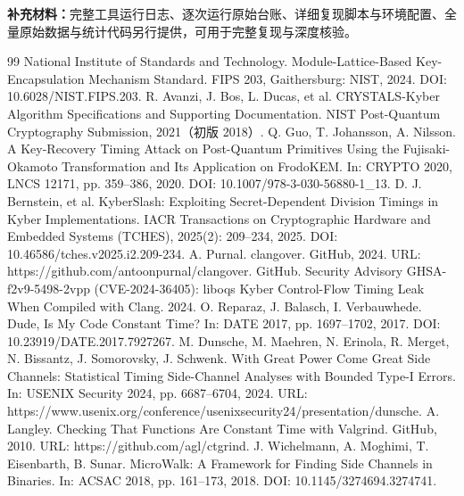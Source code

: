 \documentclass{a113_report}
\begin{document}
\makecover
\makeinfotable

\tableofcontents
\clearpage


\clearpage

\clearpage

\clearpage

\clearpage

\clearpage


\vspace{1.5em}
\noindent\textbf{补充材料：}完整工具运行日志、逐次运行原始台账、详细复现脚本与环境配置、全量原始数据与统计代码另行提供，可用于完整复现与深度核验。

\clearpage

\begin{thebibliography}{99}
 National Institute of Standards and Technology. Module-Lattice-Based Key-Encapsulation Mechanism Standard. FIPS 203, Gaithersburg: NIST, 2024. DOI: 10.6028/NIST.FIPS.203.
 R. Avanzi, J. Bos, L. Ducas, et al. CRYSTALS-Kyber Algorithm Specifications and Supporting Documentation. NIST Post-Quantum Cryptography Submission, 2021（初版 2018）.
 Q. Guo, T. Johansson, A. Nilsson. A Key-Recovery Timing Attack on Post-Quantum Primitives Using the Fujisaki-Okamoto Transformation and Its Application on FrodoKEM. In: CRYPTO 2020, LNCS 12171, pp. 359--386, 2020. DOI: 10.1007/978-3-030-56880-1\_13.
 D. J. Bernstein, et al. KyberSlash: Exploiting Secret-Dependent Division Timings in Kyber Implementations. IACR Transactions on Cryptographic Hardware and Embedded Systems (TCHES), 2025(2): 209--234, 2025. DOI: 10.46586/tches.v2025.i2.209-234.
 A. Purnal. clangover. GitHub, 2024. URL: https://github.com/antoonpurnal/clangover.
 GitHub. Security Advisory GHSA-f2v9-5498-2vpp (CVE-2024-36405): liboqs Kyber Control-Flow Timing Leak When Compiled with Clang. 2024.
 O. Reparaz, J. Balasch, I. Verbauwhede. Dude, Is My Code Constant Time? In: DATE 2017, pp. 1697--1702, 2017. DOI: 10.23919/DATE.2017.7927267.
 M. Dunsche, M. Maehren, N. Erinola, R. Merget, N. Bissantz, J. Somorovsky, J. Schwenk. With Great Power Come Great Side Channels: Statistical Timing Side-Channel Analyses with Bounded Type-I Errors. In: USENIX Security 2024, pp. 6687--6704, 2024. URL: https://www.usenix.org/conference/usenixsecurity24/presentation/dunsche.
 A. Langley. Checking That Functions Are Constant Time with Valgrind. GitHub, 2010. URL: https://github.com/agl/ctgrind.
 J. Wichelmann, A. Moghimi, T. Eisenbarth, B. Sunar. MicroWalk: A Framework for Finding Side Channels in Binaries. In: ACSAC 2018, pp. 161--173, 2018. DOI: 10.1145/3274694.3274741.

\end{thebibliography}
\end{document}
